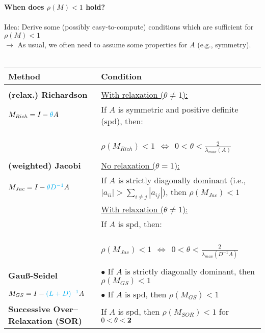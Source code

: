 \begin{frame}
\textbf{\color{header}When does $\rho(M) <1$ hold?}~\\~\\

Idea: Derive some (possibly easy-to-compute) conditions which are sufficient for $\rho(M) <1$\\
$\rightarrow$ As usual, we often need to assume some properties for $A$ (e.g., symmetry).\\~\\
{
\small
\begin{tabular}{l|l}
\textbf{Method} & \textbf{Condition} \\
\hline \\
\textbf{(relax.) Richardson}& \underline{With relaxation ($\theta \neq 1$):}
\\
$M_{Rich} =I-{\color{cyan}\theta} A$	& If $A$ is symmetric and positive definite (spd), then:\\
&~~~~~~~~~~~~~~~~~~~~~~ $\rho(M_{Rich}) < 1 ~~\Leftrightarrow~~  0 < \theta < \frac{2}{\lambda_{max}(A)}$ \\
&\\[0.3cm]
\textbf{(weighted) Jacobi}& \underline{No relaxation ($\theta = 1$):}\\
$M_{Jac} =  I-{\color{cyan}\theta D^{-1}}A$&If $A$ is strictly diagonally dominant (i.e., $|a_{ii}| > \sum_{i\neq j} |a_{ij}|$), then $\rho(M_{Jac}) < 1$\\[0.3cm]
& \underline{With relaxation ($\theta \neq 1$):}\\
&If $A$ is spd, then: \\
&~~~~~~~~~~~~~~~~~~~~~~   $\rho(M_{Jac}) < 1 ~~\Leftrightarrow~~  0 < \theta < \frac{2}{\lambda_{max}(D^{-1}A)}$\\[0.3cm]
& \\%
\textbf{Gauß-Seidel}& $\bullet$ If $A$ is strictly diagonally dominant, then $\rho(M_{GS}) < 1$\\
$M_{GS} =I-{\color{cyan}( L+D )^{-1}}A$& $\bullet$ If $A$ is spd, then $\rho(M_{GS}) < 1$\\[0.5cm]
\textbf{Successive Over--Relaxation (SOR)}& If $A$ is spd, then $\rho(M_{SOR}) < 1$ for $0 < \theta < {\bf2}$\\

\end{tabular}}
\end{frame}
